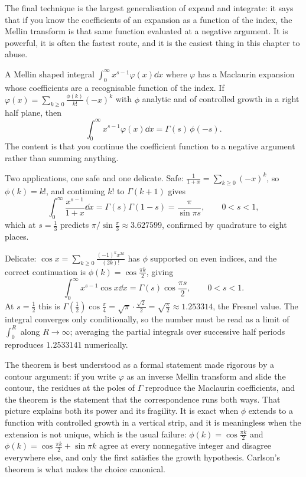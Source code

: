 The final technique is the largest generalisation of expand and integrate: it says that if you know the coefficients of an expansion as a function of the index, the Mellin transform is that same function evaluated at a negative argument. It is powerful, it is often the fastest route, and it is the easiest thing in this chapter to abuse.

\cue A Mellin shaped integral $\int_0^{\infty}x^{s-1}\varphi(x)\dd x$ where $\varphi$ has a Maclaurin expansion whose coefficients are a recognisable function of the index.
\method If $\varphi(x)=\sum_{k\geq0}\frac{\phi(k)}{k!}(-x)^{k}$ with $\phi$ analytic and of controlled growth in a right half plane, then
\[\int_0^{\infty}x^{s-1}\varphi(x)\dd x=\Gamma(s)\,\phi(-s).\]
The content is that you continue the coefficient function to a negative argument rather than summing anything.

\begin{worked}
Two applications, one safe and one delicate. Safe: $\frac{1}{1+x}=\sum_{k\geq0}(-x)^{k}$, so $\phi(k)=k!$, and continuing $k!$ to $\Gamma(k+1)$ gives
\[\int_0^{\infty}\frac{x^{s-1}}{1+x}\dd x=\Gamma(s)\Gamma(1-s)=\frac{\pi}{\sin\pi s},\qquad 0<s<1,\]
which at $s=\tfrac13$ predicts $\pi/\sin\tfrac{\pi}{3}\approx3.627599$, confirmed by quadrature to eight places.

Delicate: $\cos x=\sum_{k\geq0}\frac{(-1)^{k}x^{2k}}{(2k)!}$ has $\phi$ supported on even indices, and the correct continuation is $\phi(k)=\cos\frac{\pi k}{2}$, giving
\[\int_0^{\infty}x^{s-1}\cos x\dd x=\Gamma(s)\cos\frac{\pi s}{2},\qquad 0<s<1.\]
At $s=\tfrac12$ this is $\Gamma(\tfrac12)\cos\tfrac{\pi}{4}=\sqrt{\pi}\cdot\tfrac{\sqrt2}{2}=\sqrt{\tfrac{\pi}{2}}\approx1.253314$, the Fresnel value. The integral converges only conditionally, so the number must be read as a limit of $\int_0^{R}$ along $R\to\infty$; averaging the partial integrals over successive half periods reproduces $1.2533141$ numerically.
\end{worked}

The theorem is best understood as a formal statement made rigorous by a contour argument: if you write $\varphi$ as an inverse Mellin transform and slide the contour, the residues at the poles of $\Gamma$ reproduce the Maclaurin coefficients, and the theorem is the statement that the correspondence runs both ways. That picture explains both its power and its fragility. It is exact when $\phi$ extends to a function with controlled growth in a vertical strip, and it is meaningless when the extension is not unique, which is the usual failure: $\phi(k)=\cos\tfrac{\pi k}{2}$ and $\phi(k)=\cos\tfrac{\pi k}{2}+\sin\pi k$ agree at every nonnegative integer and disagree everywhere else, and only the first satisfies the growth hypothesis. Carlson's theorem is what makes the choice canonical.

